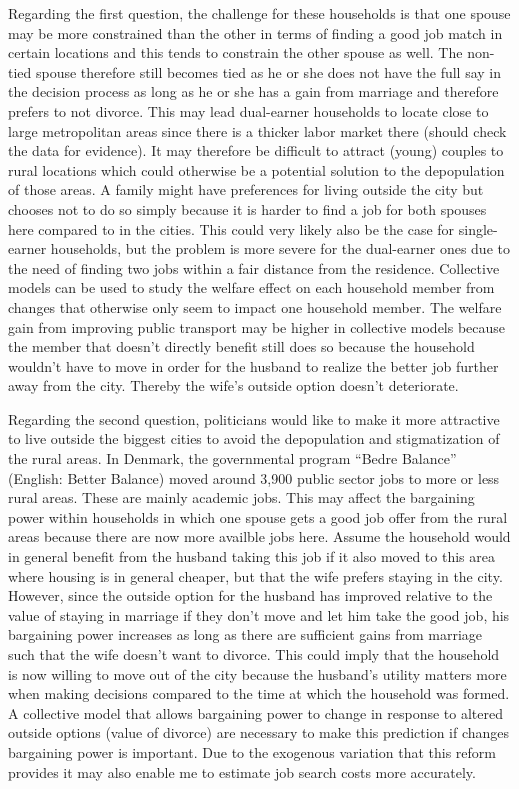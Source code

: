 Regarding the first question, the challenge for these households is that one spouse may be more constrained than the other in terms of finding a good job match in certain locations and this tends to constrain the other spouse as well. The non-tied spouse therefore still becomes tied as he or she does not have the full say in the decision process as long as he or she has a gain from marriage and therefore prefers to not divorce. This may lead dual-earner households to locate close to large metropolitan areas since there is a thicker labor market there (should check the data for evidence). It may therefore be difficult to attract (young) couples to rural locations which could otherwise be a potential solution to the depopulation of those areas. A family might have preferences for living outside the city but chooses not to do so simply because it is harder to find a job for both spouses here compared to in the cities. This could very likely also be the case for single-earner households, but the problem is more severe for the dual-earner ones due to the need of finding two jobs within a fair distance from the residence. Collective models can be used to study the welfare effect on each household member from changes that otherwise only seem to impact one household member. The welfare gain from improving public transport may be higher in collective models because the member that doesn't directly benefit still does so because the household wouldn't have to move in order for the husband to realize the better job further away from the city. Thereby the wife's outside option doesn't deteriorate. 

Regarding the second question, politicians would like to make it more attractive to live outside the biggest cities to avoid the depopulation and stigmatization of the rural areas. In Denmark, the governmental program ``Bedre Balance'' (English: Better Balance) moved around 3,900 public sector jobs to more or less rural areas. These are mainly academic jobs. This may affect the bargaining power within households in which one spouse gets a good job offer from the rural areas because there are now more availble jobs here. Assume the household would in general benefit from the husband taking this job if it also moved to this area where housing is in general cheaper, but that the wife prefers staying in the city. However, since the outside option for the husband has improved relative to the value of staying in marriage if they don't move and let him take the good job, his bargaining power increases as long as there are sufficient gains from marriage such that the wife doesn't want to divorce. This could imply that the household is now willing to move out of the city because the husband's utility matters more when making decisions compared to the time at which the household was formed. A collective model that allows bargaining power to change in response to altered outside options (value of divorce) are necessary to make this prediction if changes bargaining power is important. Due to the exogenous variation that this reform provides it may also enable me to estimate job search costs more accurately.  

